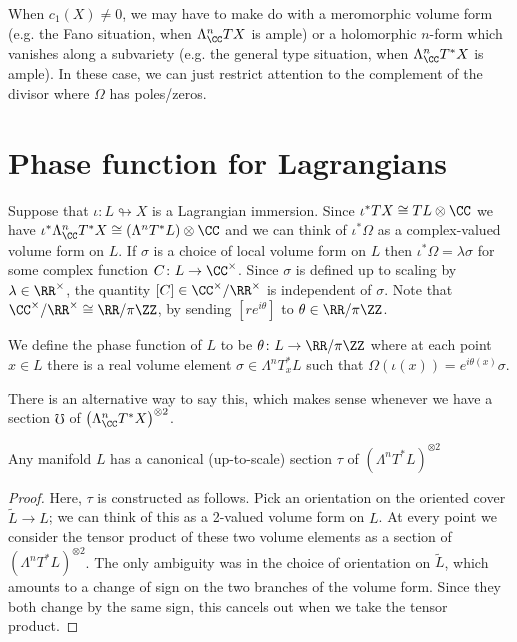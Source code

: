 \documentclass{article}
\begin{document}
\begin{Remark}
When $c_1(X)\neq 0$, we may have to make do with a meromorphic volume form (e.g. the Fano situation, when $\Lambda^n_{\CC}TX$ is ample) or a holomorphic $n$-form which vanishes along a subvariety (e.g. the general type situation, when $\Lambda^n_{\CC}T^*X$ is ample). In these case, we can just restrict attention to the complement of the divisor where $\Omega$ has poles/zeros.
\end{Remark}

\section{Phase function for Lagrangians}

Suppose that $\iota\colon L\looparrowright X$ is a Lagrangian immersion. Since $\iota^*TX\cong TL\otimes\CC$ we have $\iota^*\Lambda^n_{\CC}T^*X\cong (\Lambda^nT^*L)\otimes\CC$ and we can think of $\iota^*\Omega$ as a complex-valued volume form on $L$. If $\sigma$ is a choice of local volume form on $L$ then $\iota^*\Omega=\lambda\sigma$ for some complex function $C\colon L\to\CC^{\times}$. Since $\sigma$ is defined up to scaling by $\lambda\in\RR^{\times}$, the quantity $[C]\in\CC^{\times}/\RR^{\times}$ is independent of $\sigma$. Note that $\CC^{\times}/\RR^{\times}\cong\RR/\pi\ZZ$, by sending $[re^{i\theta}]$ to $\theta\in\RR/\pi\ZZ$.

\begin{Definition}[phasefunction]
We define the phase function of $L$ to be $\theta\colon L\to\RR/\pi\ZZ$ where at each point $x\in L$ there is a real volume element $\sigma\in\Lambda^nT_x^*L$ such that $\Omega(\iota(x))=e^{i\theta(x)}\sigma$.
\end{Definition}

\begin{Remark}
  There is an alternative way to say this, which makes sense whenever we have a section $\mho$ of $\left(\Lambda^n_{\CC}T^*X\right)^{\otimes 2}$.
\end{Remark}

\begin{Claim}[squarevolumeform]
  Any manifold $L$ has a canonical (up-to-scale) section $\tau$ of $\left(\Lambda^nT^*L\right)^{\otimes 2}$
\end{Claim}
\begin{proof}
  Here, $\tau$ is constructed as follows. Pick an orientation on the oriented cover $\tilde{L}\to L$; we can think of this as a 2-valued volume form on $L$. At every point we consider the tensor product of these two volume elements as a section of $\left(\Lambda^nT^*L\right)^{\otimes 2}$. The only ambiguity was in the choice of orientation on $\tilde{L}$, which amounts to a change of sign on the two branches of the volume form. Since they both change by the same sign, this cancels out when we take the tensor product.
\end{proof}
\end{document}
